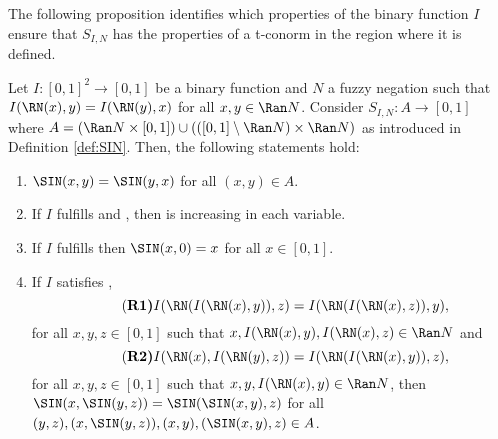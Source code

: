 The following proposition identifies which properties of the binary function $I$ ensure that $S_{I,N}$ has the properties of a t-conorm in the region where it is defined.

\begin{proposition}\label{prop:SIN} Let $I:[0,1]^2 \to [0,1]$ be a binary function and $N$ a fuzzy negation such that $I(\RN(x),y)=I(\RN(y),x)$ for all $x,y \in \Ran N$. Consider $S_{I,N}:A \to [0,1]$ where $A= (\Ran N \times [0,1]) \cup (([0,1] \setminus \Ran N) \times \Ran N)$  as introduced in Definition \ref{def:SIN}. Then, the following statements hold:
	\begin{enumerate}[label=(\roman*)]
		\item $\SIN(x,y)=\SIN(y,x)$ for all $(x,y) \in A$.
		\item If $I$ fulfills \Ione and \Itwo, then \SIN is increasing in each variable.
		\item If $I$ fulfills \NP then $\SIN(x,0)=x$ for all $x \in [0,1]$.
		\item If $I$ satisfies \EP,
		\begin{equation}\tag{\bf R1}\label{eq:R1}
			I(\RN(I(\RN(x),y)),z)=I(\RN(I(\RN(x),z)),y), 
		\end{equation}
		for all $x,y,z \in [0,1]$ such that $x,I(\RN(x),y), I(\RN(x),z) \in \Ran N$ and
		\begin{equation}\tag{\bf R2}\label{eq:R2}
			I(\RN(x),I(\RN(y),z))=I(\RN(I(\RN(x),y)),z), 
		\end{equation}
		for all $x,y,z \in [0,1]$ such that $x, y, I(\RN(x),y) \in \Ran N$,
		then $\SIN(x, \SIN (y,z))=\SIN (\SIN(x,y),z)$ for all $(y,z), (x,\SIN(y,z)), (x,y), (\SIN(x,y),z) \in A$.
	\end{enumerate}
	
\end{proposition}
